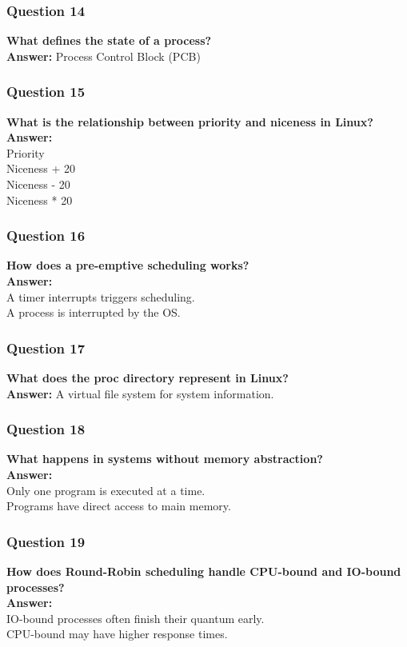 \documentclass{article}
\begin{document}
\subsubsection*{Question 14}
\textbf{What defines the state of a process?} \\
\textbf{Answer:} Process Control Block (PCB)

\subsubsection*{Question 15}
\textbf{What is the relationship between priority and niceness in Linux?} \\
\textbf{Answer:} \\
Priority \\
Niceness + 20 \\
Niceness - 20 \\
Niceness * 20

\subsubsection*{Question 16}
\textbf{How does a pre-emptive scheduling works?} \\
\textbf{Answer:} \\
A timer interrupts triggers scheduling. \\
A process is interrupted by the OS.

\subsubsection*{Question 17}
\textbf{What does the proc directory represent in Linux?} \\
\textbf{Answer:} A virtual file system for system information.

\subsubsection*{Question 18}
\textbf{What happens in systems without memory abstraction?} \\
\textbf{Answer:} \\ 
Only one program is executed at a time. \\
Programs have direct access to main memory.

\subsubsection*{Question 19}
\textbf{How does Round-Robin scheduling handle CPU-bound and IO-bound processes?} \\
\textbf{Answer:} \\
IO-bound processes often finish their quantum early. \\
CPU-bound may have higher response times. 
\end{document}
